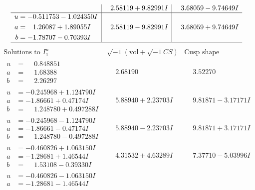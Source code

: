 \documentclass[1p]{elsarticle_modified}
\theoremstyle{definition}
\newcommand{\I}{\sqrt{-1}}
\begin{document}
$$\begin{array}{c|c|c}
 & \phantom{-}2.58119 + 9.82991 I & \phantom{-}3.68059 - 9.74649 I \\ \hline\begin{aligned}
u &= -0.511753 - 1.024350 I \\
a &= \phantom{-}1.26087 + 1.89055 I \\
b &= -1.78707 - 0.70393 I\end{aligned}
 & \phantom{-}2.58119 - 9.82991 I & \phantom{-}3.68059 + 9.74649 I\\
 \hline 
 \end{array}$$\newpage$$\begin{array}{c|c|c}  
\text{Solutions to }I^u_{1}& \I (\text{vol} + \sqrt{-1}CS) & \text{Cusp shape}\\
 \hline 
\begin{aligned}
u &= \phantom{-}0.848851\phantom{ +0.000000I} \\
a &= \phantom{-}1.68388\phantom{ +0.000000I} \\
b &= \phantom{-}2.26297\phantom{ +0.000000I}\end{aligned}
 & \phantom{-}2.68190\phantom{ +0.000000I} & \phantom{-}3.52270\phantom{ +0.000000I} \\ \hline\begin{aligned}
u &= -0.245968 + 1.124790 I \\
a &= -1.86661 + 0.47174 I \\
b &= \phantom{-}1.248780 + 0.497288 I\end{aligned}
 & \phantom{-}5.88940 + 2.23703 I & \phantom{-}9.81871 - 3.17171 I \\ \hline\begin{aligned}
u &= -0.245968 - 1.124790 I \\
a &= -1.86661 - 0.47174 I \\
b &= \phantom{-}1.248780 - 0.497288 I\end{aligned}
 & \phantom{-}5.88940 - 2.23703 I & \phantom{-}9.81871 + 3.17171 I \\ \hline\begin{aligned}
u &= -0.460826 + 1.063150 I \\
a &= -1.28681 + 1.46544 I \\
b &= \phantom{-}1.53108 - 0.39330 I\end{aligned}
 & \phantom{-}4.31532 + 4.63289 I & \phantom{-}7.37710 - 5.03996 I \\ \hline\begin{aligned}
u &= -0.460826 - 1.063150 I \\
a &= -1.28681 - 1.46544 I \\

\end{aligned}
\end{array}$$
\end{document}
